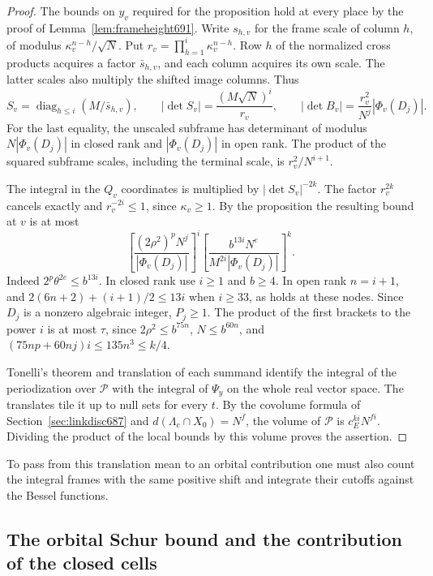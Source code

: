 \documentclass[a4paper,11pt]{article}
\theoremstyle{definition}
\theoremstyle{remark}
\numberwithin{equation}{section}
\begin{document}
\begin{proof}
The bounds on \(y_v\) required for the proposition hold at
every place by the proof of Lemma~\ref{lem:frameheight691}.
Write \(s_{h,v}\) for the frame scale of column \(h\), of
modulus \(\kappa_v^{n-h}/\sqrt N\). Put
\(r_v=\prod_{h=1}^i\kappa_v^{n-h}\). Row \(h\) of the
normalized cross products acquires a factor \(\bar s_{h,v}\),
and each column acquires its own scale. The latter scales also
multiply the shifted image columns. Thus
\[
 S_v=\operatorname{diag}_{h\le i}(M/\bar s_{h,v}),\qquad
 |\det S_v|=\frac{(M\sqrt N)^i}{r_v},\qquad
 |\det B_v|=\frac{r_v^2}{N^j}|\Phi_v(D_j)|.
\]
For the last equality, the unscaled subframe has determinant
of modulus \(N|\Phi_v(D_j)|\) in closed rank and
\(|\Phi_v(D_j)|\) in open rank. The product of the squared
subframe scales, including the terminal scale, is
\(r_v^2/N^{i+1}\).

The integral in the \(Q_v\) coordinates is multiplied by
\(|\det S_v|^{-2k}\). The factor \(r_v^{2k}\) cancels exactly
and \(r_v^{-2i}\le1\), since \(\kappa_v\ge1\). By the
proposition the resulting bound at \(v\) is at most
\[
 \left[\frac{(2\rho^2)^pN^j}{|\Phi_v(D_j)|}\right]^i
 \left[\frac{b^{13i}N^{e}}{M^{2i}|\Phi_v(D_j)|}\right]^k .
\]
Indeed \(2^p\theta^{2e}\le b^{13i}\). In closed rank use
\(i\ge1\) and \(b\ge4\). In open rank \(n=i+1\), and
\(2(6n+2)+(i+1)/2\le13i\) when \(i\ge33\), as holds at
these nodes. Since \(D_j\) is a nonzero algebraic integer,
\(P_j\ge1\). The product of the first brackets to the power
\(i\) is at most \(\tau\), since \(2\rho^2\le b^{75n}\),
\(N\le b^{60n}\), and
\((75np+60nj)i\le135n^3\le k/4\).

Tonelli's theorem and translation of each summand identify
the integral of the periodization over \(\mathcal P\) with
the integral of \(\Psi_y\) on the whole real vector space.
The translates tile it up to null sets for every \(t\).
By the covolume formula of Section~\ref{sec:linkdisc687}
and \(d(\Lambda_c\cap X_0)=N^f\), the volume of
\(\mathcal P\) is \(c_E^{ki}N^{fi}\). Dividing the product
of the local bounds by this volume proves the assertion.
\end{proof}

To pass from this translation mean to an orbital contribution
one must also count the integral frames with the same positive
shift and integrate their cutoffs against the Bessel functions.


\subsection{The orbital Schur bound and the contribution of the closed cells}
\label{sec:orbitalclosed693}
\end{document}
